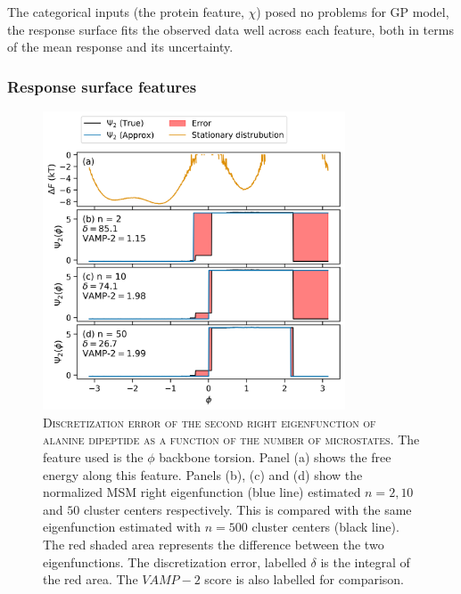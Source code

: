 The categorical inputs (the protein feature, $\chi$) posed no problems for GP model, the response surface fits the observed data well across each feature, both in terms of the mean response and its uncertainty. 

\subsubsection{Response surface features}

\begin{figure}
    \centering
    \caption[Discretization error of the second right eigenfunction of alanine dipeptide as a function of the number of microstates]{\textsc{Discretization error of the second right eigenfunction of alanine dipeptide as a function of the number of microstates}. The feature used is the $\phi$ backbone torsion. Panel (a) shows the free energy along this feature. Panels (b), (c) and (d) show the normalized MSM right eigenfunction (blue line) estimated $n=2, 10$ and $50$ cluster centers respectively. This is compared with the same eigenfunction estimated with $n=500$ cluster centers (black line). The red shaded area represents the difference between the two eigenfunctions. The discretization error, labelled $\delta$ is the integral of the red area. The $VAMP-2$ score is also labelled for comparison.}
    \label{fig:ala1_evcompare}
    \includegraphics[width=0.8\textwidth]{chapters/msm_optimization/figures/ala1_ev_n_compare.png}
\end{figure}


